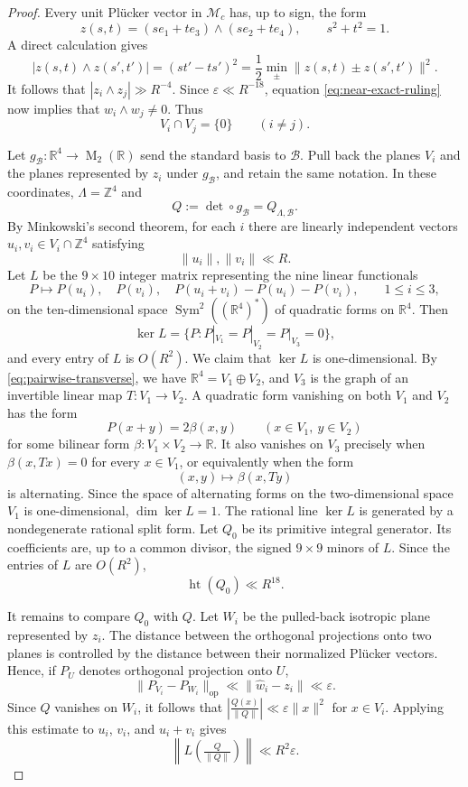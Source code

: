\documentclass[10pt,a4paper]{amsart}
\newcommand{\M}{\operatorname{M}}
\begin{document}
\begin{proof}
Every unit Pl\"ucker vector in $\mathcal M_c$ has, up to sign, the form
$$
z(s,t)
=
(se_1+te_3)\wedge(se_2+te_4),
\qquad
s^2+t^2=1.
$$
A direct calculation gives
$$
|z(s,t)\wedge z(s',t')|
=
(st'-ts')^2
=
\frac12\min_{\pm}\|z(s,t)\pm z(s',t')\|^2.
$$
It follows that $|z_i\wedge z_j|\gg R^{-4}$. Since
$\varepsilon\ll R^{-18}$, equation \eqref{eq:near-exact-ruling} now implies
that $w_i\wedge w_j\ne0$. Thus
\begin{equation}\label{eq:pairwise-transverse}
V_i\cap V_j=\{0\}
\qquad
(i\ne j).
\end{equation}

Let $g_{\mathcal B}:\mathbb R^4\to\M_2(\mathbb R)$ send the standard basis
to $\mathcal B$. Pull back the planes $V_i$ and the planes represented by
$z_i$ under $g_{\mathcal B}$, and retain the same notation.  In these
coordinates, $\Lambda=\mathbb Z^4$ and
$$
Q:=\det\circ g_{\mathcal B}=Q_{\Lambda,\mathcal B}.
$$
By Minkowski's second theorem, for each $i$ there are linearly independent
vectors $u_i,v_i\in V_i\cap\mathbb Z^4$ satisfying
$$
\|u_i\|,\|v_i\|\ll R.
$$
Let $L$ be the $9\times10$ integer matrix representing the nine linear
functionals
$$
P\mapsto P(u_i),\quad
P(v_i),\quad
P(u_i+v_i)-P(u_i)-P(v_i),
\qquad
1\le i\le3,
$$
on the ten-dimensional space $\operatorname{Sym}^2((\mathbb R^4)^*)$ of quadratic forms on $\mathbb R^4$. Then
$$
\ker L
=
\{P:P|_{V_1}=P|_{V_2}=P|_{V_3}=0\},
$$
and every entry of $L$ is $O(R^2)$. We claim that $\ker L$ is one-dimensional. By
\eqref{eq:pairwise-transverse}, we have
$\mathbb R^4=V_1\oplus V_2$, and $V_3$ is the graph of an invertible linear
map $T:V_1\to V_2$. A quadratic form vanishing on both $V_1$ and $V_2$ has
the form
$$
P(x+y)=2\beta(x,y)
\qquad
(x\in V_1,\ y\in V_2)
$$
for some bilinear form $\beta:V_1\times V_2\to\mathbb R$. It also vanishes
on $V_3$ precisely when $\beta(x,Tx)=0$ for every $x\in V_1$, or
equivalently when the form
$$
(x,y)\mapsto\beta(x,Ty)
$$
is alternating. Since the space of alternating forms on the
two-dimensional space $V_1$ is one-dimensional, $\dim\ker L=1$.
The rational line $\ker L$ is generated by a nondegenerate rational
split form. Let $Q_0$ be its primitive integral generator.
 Its
coefficients are, up to a common divisor, the signed $9\times9$ minors of
$L$. Since the entries of $L$ are $O(R^2)$,
\begin{equation}\label{eq:Q0-height}
\operatorname{ht}(Q_0)\ll R^{18}.
\end{equation}

It remains to compare $Q_0$ with $Q$. Let $W_i$ be the pulled-back
isotropic plane represented by $z_i$. The distance between the orthogonal
projections onto two planes is controlled by the distance between their
normalized Pl\"ucker vectors. Hence, if $P_U$ denotes orthogonal projection
onto $U$,
$$
\|P_{V_i}-P_{W_i}\|_{\operatorname{op}}
\ll
\|\widehat w_i-z_i\|
\ll\varepsilon.
$$
Since $Q$ vanishes on $W_i$, it follows that
$
\left|\frac{Q(x)}{\|Q\|}\right|
\ll
\varepsilon\|x\|^2$ for $x\in V_i$.
Applying this estimate to $u_i$, $v_i$, and $u_i+v_i$ gives
\begin{equation}\label{eq:LQ-small}
\left\|
L\left(\tfrac{Q}{\|Q\|}\right)
\right\|
\ll
R^2\varepsilon.
\end{equation}


\end{proof}
\end{document}
